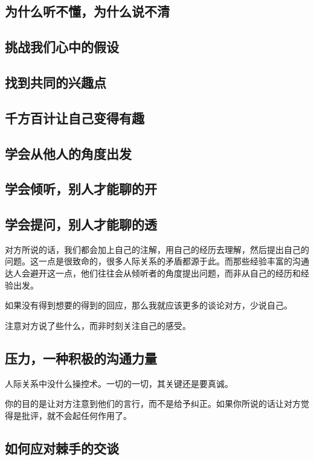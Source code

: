 \documentclass[UTF8,a4paper,8pt]{ctexbook}
\begin{document}
		\subsection{为什么听不懂，为什么说不清}
		
		\subsection{挑战我们心中的假设}
		
		\subsection{找到共同的兴趣点}
		
		\subsection{千方百计让自己变得有趣}
		
		\subsection{学会从他人的角度出发}
		
		\subsection{学会倾听，别人才能聊的开}
		
		\subsection{学会提问，别人才能聊的透}
			对方所说的话，我们都会加上自己的注解，用自己的经历去理解，然后提出自己的问题。这一点是很致命的，很多人际关系的矛盾都源于此。而那些经验丰富的沟通达人会避开这一点，他们往往会从倾听者的角度提出问题，而非从自己的经历和经验出发。
			
			如果没有得到想要的得到的回应，那么我就应该更多的谈论对方，少说自己。
			
			注意对方说了些什么，而非时刻关注自己的感受。
		
		\subsection{压力，一种积极的沟通力量}
		
			人际关系中没什么操控术。一切的一切，其关键还是要真诚。
		
			你的目的是让对方注意到他们的言行，而不是给予纠正。如果你所说的话让对方觉得是批评，就不会起任何作用了。
		\subsection{如何应对棘手的交谈}
		
\end{document}

